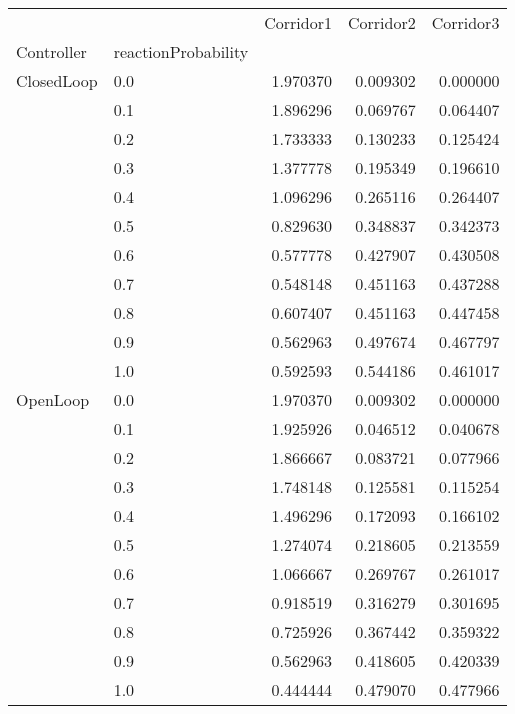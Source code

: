 \begin{tabular}{llrrr}
\toprule
         &     &  Corridor1 &  Corridor2 &  Corridor3 \\
Controller & reactionProbability &            &            &            \\
\midrule
ClosedLoop & 0.0 &   1.970370 &   0.009302 &   0.000000 \\
         & 0.1 &   1.896296 &   0.069767 &   0.064407 \\
         & 0.2 &   1.733333 &   0.130233 &   0.125424 \\
         & 0.3 &   1.377778 &   0.195349 &   0.196610 \\
         & 0.4 &   1.096296 &   0.265116 &   0.264407 \\
         & 0.5 &   0.829630 &   0.348837 &   0.342373 \\
         & 0.6 &   0.577778 &   0.427907 &   0.430508 \\
         & 0.7 &   0.548148 &   0.451163 &   0.437288 \\
         & 0.8 &   0.607407 &   0.451163 &   0.447458 \\
         & 0.9 &   0.562963 &   0.497674 &   0.467797 \\
         & 1.0 &   0.592593 &   0.544186 &   0.461017 \\
OpenLoop & 0.0 &   1.970370 &   0.009302 &   0.000000 \\
         & 0.1 &   1.925926 &   0.046512 &   0.040678 \\
         & 0.2 &   1.866667 &   0.083721 &   0.077966 \\
         & 0.3 &   1.748148 &   0.125581 &   0.115254 \\
         & 0.4 &   1.496296 &   0.172093 &   0.166102 \\
         & 0.5 &   1.274074 &   0.218605 &   0.213559 \\
         & 0.6 &   1.066667 &   0.269767 &   0.261017 \\
         & 0.7 &   0.918519 &   0.316279 &   0.301695 \\
         & 0.8 &   0.725926 &   0.367442 &   0.359322 \\
         & 0.9 &   0.562963 &   0.418605 &   0.420339 \\
         & 1.0 &   0.444444 &   0.479070 &   0.477966 \\
\bottomrule
\end{tabular}
